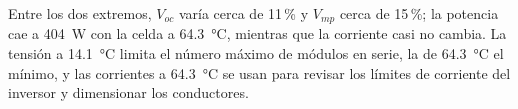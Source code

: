 Entre los dos extremos, $V_{oc}$ varía cerca de 11\,\% y $V_{mp}$ cerca de 15\,\%; la potencia cae a \SI{404}{W} con la celda a \SI{64.3}{\celsius}, mientras que la corriente casi no cambia. La tensión a \SI{14.1}{\celsius} limita el número máximo de módulos en serie, la de \SI{64.3}{\celsius} el mínimo, y las corrientes a \SI{64.3}{\celsius} se usan para revisar los límites de corriente del inversor y dimensionar los conductores.
